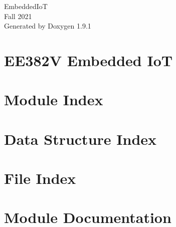 \let\mypdfximage\pdfximage\def\pdfximage{\immediate\mypdfximage}\documentclass[twoside]{book}
\newcommand{\+}{\discretionary{\mbox{\scriptsize$\hookleftarrow$}}{}{}}
\newcommand{\clearemptydoublepage}{%
  \newpage{\pagestyle{empty}\cleardoublepage}%
}
\begin{document}
\raggedbottom

\hypersetup{pageanchor=false,
             bookmarksnumbered=true,
             pdfencoding=unicode
            }
\begin{titlepage}
\vspace*{7cm}
\begin{center}%
{\Large Embedded\+IoT \\[1ex]\large Fall 2021 }\\
\vspace*{1cm}
{\large Generated by Doxygen 1.9.1}\\
\end{center}
\end{titlepage}
\clearemptydoublepage
{}
\tableofcontents
\clearemptydoublepage
{}
\hypersetup{pageanchor=true}

\chapter{EE382V Embedded IoT}
\label{index}\hypertarget{index}{}
\chapter{Module Index}

\chapter{Data Structure Index}

\chapter{File Index}

\chapter{Module Documentation}







\end{document}
